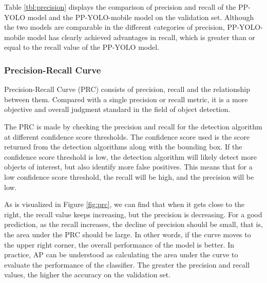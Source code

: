 \documentclass[sensors,article,submit,moreauthors,pdftex]{Definitions/mdpi}
\begin{document}
Table \ref{tbl:precision} displays the comparison of precision and recall of the PP-YOLO model and the PP-YOLO-mobile model on the validation set. Although the two models are comparable in the different categories of precision, PP-YOLO-mobile model has clearly achieved advantages in recall, which is greater than or equal to the recall value of the PP-YOLO model.


\subsubsection{Precision-Recall Curve}
Precision-Recall Curve (PRC) consists of precision, recall and the relationship between them. Compared with a single precision or recall metric, it is a more objective and overall judgment standard in the field of object detection. 

The PRC is made by checking the precision and recall for the detection algorithm at different confidence score thresholds. The confidence score used is the score returned from the detection algorithms along with the bounding box. If the confidence score threshold is low, the detection algorithm will likely detect more objects of interest, but also identify more false positives. This means that for a low confidence score threshold, the recall will be high, and the precision will be low.

As is visualized in Figure \ref{fig:prc}, we can find that when it gets close to the right, the recall value keeps increasing, but the precision is decreasing. For a good prediction, as the recall increases, the decline of precision should be small, that is, the area under the PRC should be large. In other words, if the curve moves to the upper right corner, the overall performance of the model is better. In practice, AP can be understood as calculating the area under the curve to evaluate the performance of the classifier. The greater the precision and recall values, the higher the accuracy on the validation set.
\end{document}
